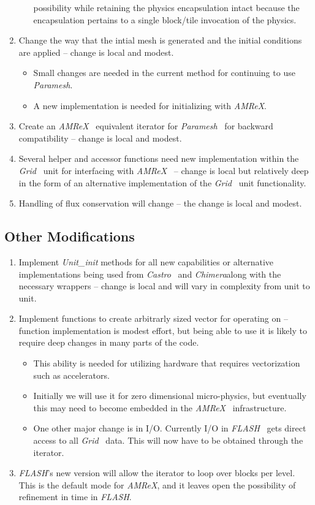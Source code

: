 \documentclass{article}
\newcommand{\flash}{{\it FLASH}}
\newcommand{\amrex}{{\it AMReX}}
\newcommand{\paramesh}{{\it Paramesh}}
\newcommand{\castro}{{\it Castro}}
\newcommand{\chimera}{{\it Chimera}}
\newcommand{\grid}{{\it Grid}}
\begin{document}
\begin{enumerate}
\begin{itemize}
possibility while retaining the physics encapsulation intact because
the encapsulation pertains to a single block/tile invocation of the physics.
\end{itemize}
\item Change the way that the intial mesh is generated and the initial
conditions are applied -- change is local and modest.
\begin{itemize}
\item Small changes are needed in the current method for continuing
to use \paramesh.
\item A new implementation is needed for initializing with \amrex.
\end{itemize}
\item Create an \amrex~ equivalent iterator for \paramesh~ for backward
compatibility -- change is local and modest.
\item Several helper and accessor functions need new implementation within the
\grid~ unit for interfacing with \amrex~ -- change is local but
relatively deep in the form of an alternative implementation of the
\grid~ unit functionality.
\item Handling of flux conservation will change -- the change is local
and modest.
\end{enumerate}

\subsection{Other Modifications}
\label{sec:other}
\begin{enumerate}
\item Implement {\it Unit\_init} methods for all new capabilities or
alternative implementations being used from \castro~ and \chimera along
with the necessary wrappers -- change is local and will vary in
complexity from unit to unit.
\item Implement functions to create arbitrarly sized vector for
operating on -- function implementation is modest effort, but being
able to use it is likely to require deep changes in many parts of the
code.
\begin{itemize}
\item This ability is needed for utilizing hardware that requires
vectorization such as accelerators.
\item Initially we will use it for zero dimensional micro-physics, but
eventually this may need to become embedded in the \amrex~
infrastructure.
\item One other major change is in I/O. Currently I/O in \flash~ gets
direct access to all \grid~ data. This will now have to be obtained
through the iterator.
\end{itemize}
\item \flash's new version will allow the iterator to loop over blocks
per level. This is the default mode for \amrex, and it leaves open the
possibility of refinement in time in \flash.
\end{enumerate}
\end{document}
